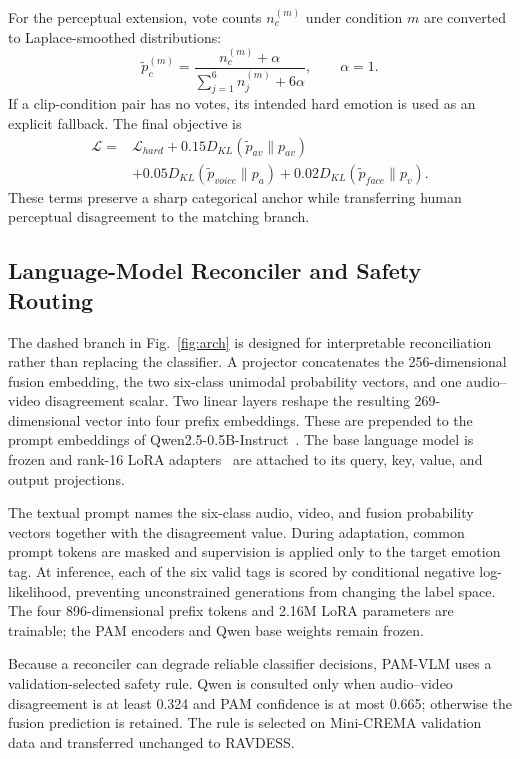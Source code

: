\documentclass[conference]{IEEEtran}
\begin{document}
For the perceptual extension, vote counts $n_c^{(m)}$ under condition $m$ are
converted to Laplace-smoothed distributions:
\begin{equation}
  \tilde{p}^{(m)}_c =
  \frac{n^{(m)}_c+\alpha}
       {\sum_{j=1}^{6}n^{(m)}_j+6\alpha},
  \qquad \alpha=1.
\end{equation}
If a clip-condition pair has no votes, its intended hard emotion is used as an
explicit fallback. The final objective is
\begin{equation}
\begin{aligned}
  \mathcal{L}={}&\mathcal{L}_{hard}
  +0.15D_{KL}(\tilde p_{av}\|p_{av})\\
  &+0.05D_{KL}(\tilde p_{voice}\|p_a)
  +0.02D_{KL}(\tilde p_{face}\|p_v).
\end{aligned}
\end{equation}
These terms preserve a sharp categorical anchor while transferring human
perceptual disagreement to the matching branch.

\subsection{Language-Model Reconciler and Safety Routing}

The dashed branch in Fig.~\ref{fig:arch} is designed for interpretable
reconciliation rather than replacing the classifier. A projector concatenates
the 256-dimensional fusion embedding, the two six-class unimodal probability
vectors, and one audio--video disagreement scalar. Two linear layers reshape
the resulting 269-dimensional vector into four prefix embeddings. These are
prepended to the prompt embeddings of
Qwen2.5-0.5B-Instruct~\cite{qwen2025}. The base language model is frozen and
rank-16 LoRA adapters~\cite{hu2022lora} are attached to its query, key, value,
and output projections.

The textual prompt names the six-class audio, video, and fusion probability
vectors together with the disagreement value. During adaptation, common
prompt tokens are masked and supervision is applied only to the target emotion
tag. At inference, each of the six valid tags is scored by conditional
negative log-likelihood, preventing unconstrained generations from changing
the label space. The four 896-dimensional prefix tokens and 2.16M LoRA
parameters are trainable; the PAM encoders and Qwen base weights remain
frozen.

Because a reconciler can degrade reliable classifier decisions, PAM-VLM uses
a validation-selected safety rule. Qwen is consulted only when audio--video
disagreement is at least 0.324 and PAM confidence is at most 0.665; otherwise
the fusion prediction is retained. The rule is selected on Mini-CREMA
validation data and transferred unchanged to RAVDESS.
\end{document}
